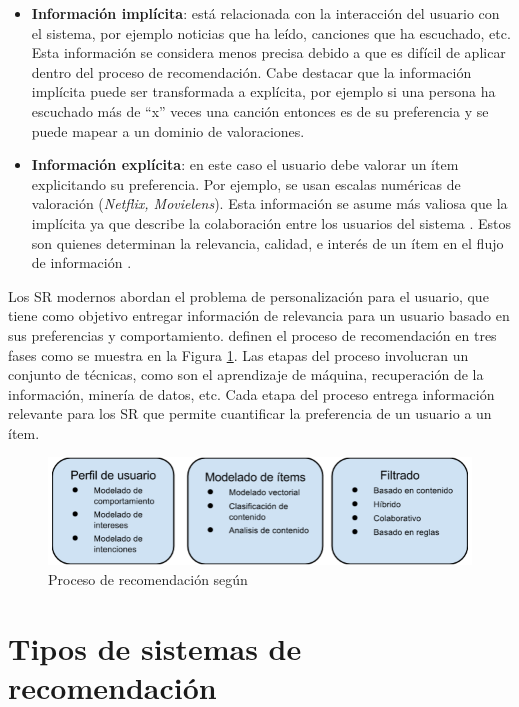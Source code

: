\begin{itemize}
\item \textbf{Información implícita}: está relacionada con la interacción del usuario con el sistema, por ejemplo noticias que ha leído, canciones que ha escuchado, etc. Esta información se considera menos precisa debido a que es difícil de aplicar dentro del proceso de recomendación. Cabe destacar que la información implícita puede ser transformada a explícita, por ejemplo si una persona ha escuchado más de ``x'' veces una canción entonces es de su preferencia y se puede mapear a un dominio de valoraciones.

\item \textbf{Información explícita}: en este caso el usuario debe valorar un ítem explicitando su preferencia. Por ejemplo, se usan escalas numéricas de valoración  (\textit{Netflix, Movielens}). Esta información se asume más valiosa que la implícita ya que describe la colaboración entre los usuarios del sistema \citep{Zanker:2009}. Estos son quienes determinan la relevancia, calidad, e interés de un ítem en el flujo de información \citep{Herlocker:1999}.
\end{itemize}

Los SR modernos abordan el problema de personalización  para el usuario, que tiene como objetivo entregar información de relevancia para un usuario basado en sus preferencias y comportamiento. \cite{Gao:2010} definen el proceso de recomendación en tres fases como se muestra en la Figura \ref{fig:procrecomendacion}. Las etapas del proceso involucran un conjunto de técnicas, como son el aprendizaje de máquina, recuperación de la información, minería de datos, etc. Cada etapa del proceso entrega información relevante para los SR que permite cuantificar la preferencia de un usuario a un ítem.

\begin{figure}[tp]
\centering
\includegraphics[scale=.75]{images/procrecomendacion.png}
\caption{Proceso de recomendaci\'on según \citep{Gao:2010}}
\label{fig:procrecomendacion}
\end{figure}

\section{Tipos de sistemas de recomendaci\'on}
\label{marco:tecnicasrecomendacion}

